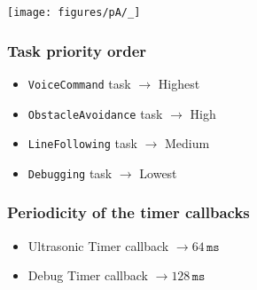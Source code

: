 \vspace*{-2em}
\begin{figure*}[htbp]
    \centering
    \begin{minipage}{0.45\linewidth}
        \centering
        \texttt{[image: figures/pA/\_]}
    \end{minipage}
    \hfill
    \begin{minipage}{0.49\linewidth}
        \subsubsection*{Task priority order}
        \vspace*{-1em}
        \begin{itemize}[noitemsep, topsep=0pt, partopsep=0pt, parsep=0pt]
            \item \texttt{VoiceCommand} task \( \to \) Highest
            \item \texttt{ObstacleAvoidance} task \( \to \) High
            \item \texttt{LineFollowing} task \( \to \) Medium
            \item \texttt{Debugging} task \( \to \) Lowest
        \end{itemize}

        \subsubsection*{Periodicity of the timer callbacks}
        \vspace*{-1em}
        \begin{itemize}[noitemsep, topsep=0pt, partopsep=0pt, parsep=0pt]
            \item Ultrasonic Timer callback \( \to 64\,\texttt{ms} \)
            \item Debug Timer callback \( \to 128\,\texttt{ms} \)
        \end{itemize}
    \end{minipage}
\end{figure*}
